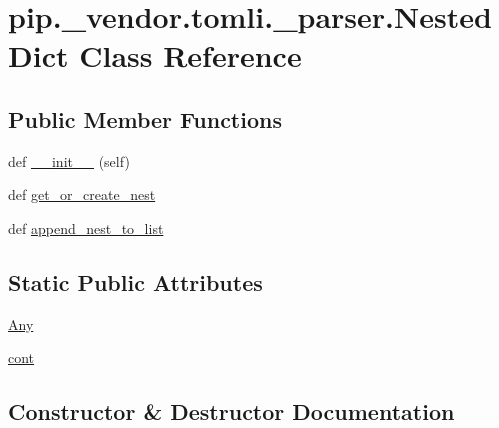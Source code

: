 \hypertarget{classpip_1_1__vendor_1_1tomli_1_1__parser_1_1NestedDict}{}\section{pip.\+\_\+vendor.\+tomli.\+\_\+parser.\+Nested\+Dict Class Reference}
\label{classpip_1_1__vendor_1_1tomli_1_1__parser_1_1NestedDict}
\subsection*{Public Member Functions}
\begin{DoxyCompactItemize}
\item 
def \hyperlink{classpip_1_1__vendor_1_1tomli_1_1__parser_1_1NestedDict_a070b6d26fa204da1409e6adfaa37e23b}{\+\_\+\+\_\+init\+\_\+\+\_\+} (self)
\item 
def \hyperlink{classpip_1_1__vendor_1_1tomli_1_1__parser_1_1NestedDict_ac29915fa4adc0263ff8fa0397941072b}{get\+\_\+or\+\_\+create\+\_\+nest}
\item 
def \hyperlink{classpip_1_1__vendor_1_1tomli_1_1__parser_1_1NestedDict_ac7080e5379cefaeda7d78e5aa923e16a}{append\+\_\+nest\+\_\+to\+\_\+list}
\end{DoxyCompactItemize}
\subsection*{Static Public Attributes}
\begin{DoxyCompactItemize}
\item 
\hyperlink{classpip_1_1__vendor_1_1tomli_1_1__parser_1_1NestedDict_acc3ecaac065d503022046275823529b2}{Any}
\item 
\hyperlink{classpip_1_1__vendor_1_1tomli_1_1__parser_1_1NestedDict_a3a3dbc49af6be66636f05c464b5cf08a}{cont}
\end{DoxyCompactItemize}


\subsection{Constructor \& Destructor Documentation}
\mbox{\label{classpip_1_1__vendor_1_1tomli_1_1__parser_1_1NestedDict_a070b6d26fa204da1409e6adfaa37e23b}} 
